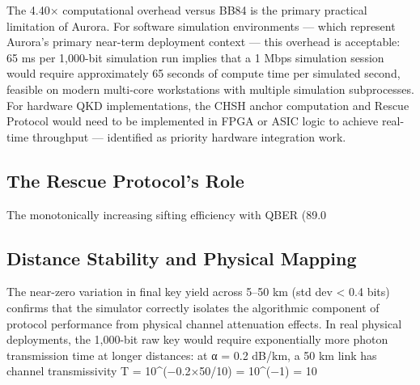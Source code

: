 {{{{{{The 4.40× computational overhead versus BB84 is the primary practical limitation of Aurora. For software simulation environments — which represent Aurora's primary near-term deployment context — this overhead is acceptable: 65 ms per 1,000-bit simulation run implies that a 1 Mbps simulation session would require approximately 65 seconds of compute time per simulated second, feasible on modern multi-core workstations with multiple simulation subprocesses. For hardware QKD implementations, the CHSH anchor computation and Rescue Protocol would need to be implemented in FPGA or ASIC logic to achieve real-time throughput — identified as priority hardware integration work.

\subsection{The Rescue Protocol's Role}
The monotonically increasing sifting efficiency with QBER (89.0%

\subsection{Distance Stability and Physical Mapping}
The near-zero variation in final key yield across 5–50 km (std dev < 0.4 bits) confirms that the simulator correctly isolates the algorithmic component of protocol performance from physical channel attenuation effects. In real physical deployments, the 1,000-bit raw key would require exponentially more photon transmission time at longer distances: at α = 0.2 dB/km, a 50 km link has channel transmissivity T = 10^(−0.2×50/10) = 10^(−1) = 10%

}}}}}}

